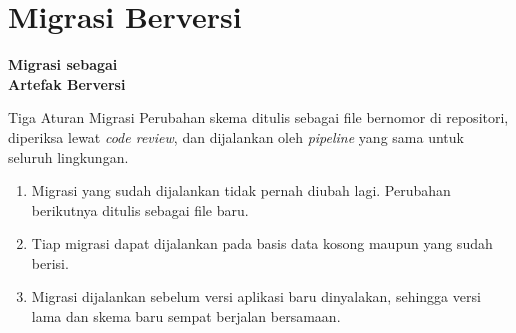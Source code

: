 \documentclass[aspectratio=169, table, 12pt]{beamer}
\begin{document}
\section{Migrasi Berversi}

\begin{frame}{\hfill}
  \centering
  \Huge{\textbf{Migrasi sebagai\\Artefak Berversi}}
\end{frame}

\begin{frame}{{\Large Tiga Aturan Migrasi}}
  \vspace{8pt}
  Perubahan skema ditulis sebagai file bernomor di repositori, diperiksa
  lewat \textit{code review}, dan dijalankan oleh \textit{pipeline} yang sama
  untuk seluruh lingkungan.
  \vspace{2pt}
  \begin{enumerate}
    \item Migrasi yang sudah dijalankan tidak pernah diubah lagi. Perubahan
          berikutnya ditulis sebagai file baru.
    \item Tiap migrasi dapat dijalankan pada basis data kosong maupun yang
          sudah berisi.
    \item Migrasi dijalankan sebelum versi aplikasi baru dinyalakan, sehingga
          versi lama dan skema baru sempat berjalan bersamaan.
  \end{enumerate}
\end{frame}
\end{document}
